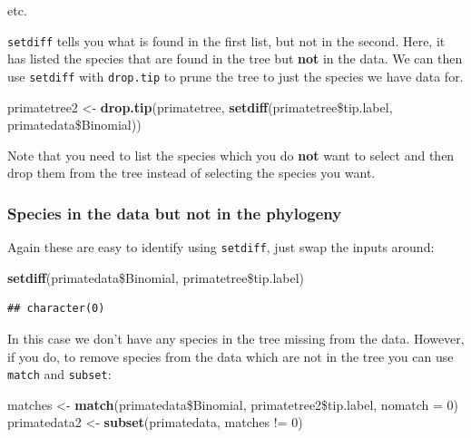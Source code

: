 \documentclass[12pt]{article}
\newcommand{\KeywordTok}[1]{\textcolor[rgb]{0.13,0.29,0.53}{\textbf{{#1}}}}
\newcommand{\DataTypeTok}[1]{\textcolor[rgb]{0.13,0.29,0.53}{{#1}}}
\newcommand{\DecValTok}[1]{\textcolor[rgb]{0.00,0.00,0.81}{{#1}}}
\newcommand{\StringTok}[1]{\textcolor[rgb]{0.31,0.60,0.02}{{#1}}}
\newcommand{\NormalTok}[1]{{#1}}
\begin{document}
etc.

\texttt{setdiff} tells you what is found in the first list, but not in the second. Here, it has listed the species that are found in the tree but \textbf{not} in the data. We can then use \texttt{setdiff} with \texttt{drop.tip} to prune the tree to just the species we have data for. 

\begin{snugshade}
\begin{Highlighting}[]
\NormalTok{primatetree2 <-}\StringTok{ }\KeywordTok{drop.tip}\NormalTok{(primatetree, }
      \KeywordTok{setdiff}\NormalTok{(primatetree\$tip.label, primatedata\$Binomial))}
\end{Highlighting}
\end{snugshade}

Note that you need to list the species which you do \textbf{not} want to select and then drop them from the tree instead of selecting the species you want.

\subsubsection{Species in the data but not in the phylogeny}
Again these are easy to identify using \texttt{setdiff}, just swap the inputs around:

\begin{snugshade}
\begin{Highlighting}[]
\KeywordTok{setdiff}\NormalTok{(primatedata\$Binomial, primatetree\$tip.label)}
\end{Highlighting}
\end{snugshade}

\begin{verbatim}
## character(0)
\end{verbatim}

In this case we don't have any species in the tree missing from the data. However, if you do, to remove species from the data which are not in the tree you can use \texttt{match} and \texttt{subset}:

\begin{snugshade}
\begin{Highlighting}[]
\NormalTok{matches <-}\StringTok{ }\KeywordTok{match}\NormalTok{(primatedata\$Binomial, primatetree2\$tip.label, }\DataTypeTok{nomatch =} \DecValTok{0}\NormalTok{)}
\NormalTok{primatedata2 <-}\StringTok{ }\KeywordTok{subset}\NormalTok{(primatedata, matches !=}\StringTok{ }\DecValTok{0}\NormalTok{)}
\end{Highlighting}
\end{snugshade}
\end{document}
